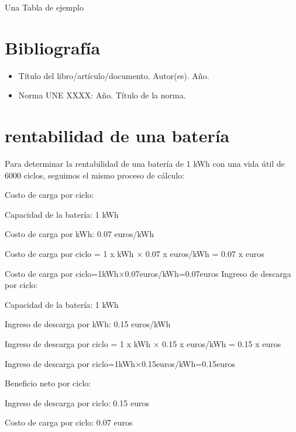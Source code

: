 \documentclass[a4paper,12pt]{article}
\begin{document}
\begin{Form}
\begin{table}[ht]
    \centering
    \caption{Una Tabla de ejemplo}
    \pgfplotstabletypeset[
        col sep=comma,
        every head row/.style={before row=\toprule, after row=\midrule},
        every last row/.style={after row=\bottomrule},
        string type %
    ]{\datosNoNumericos}
\end{table}

\newpage
\section*{Bibliografía}
\begin{itemize}
    \item Título del libro/artículo/documento. Autor(es). Año.
    \item Norma UNE XXXX: Año. Título de la norma.
\end{itemize}



\section*{rentabilidad de una batería}



Para determinar la rentabilidad de una batería de 1 kWh con una vida útil de 6000 ciclos, seguimos el mismo proceso de cálculo:

Costo de carga por ciclo:

Capacidad de la batería: 1 kWh

Costo de carga por kWh: 0.07 euros/kWh

Costo de carga por ciclo
=
1
x
kWh
×
0.07
x
euros/kWh
=
0.07
x
euros

Costo de carga por ciclo=1kWh×0.07euros/kWh=0.07euros
Ingreso de descarga por ciclo:


Capacidad de la batería: 1 kWh

Ingreso de descarga por kWh: 0.15 euros/kWh

Ingreso de descarga por ciclo
=
1
x
kWh
×
0.15
x
euros/kWh
=
0.15
x
euros

Ingreso de descarga por ciclo=1kWh×0.15euros/kWh=0.15euros

Beneficio neto por ciclo:

Ingreso de descarga por ciclo: 0.15 euros

Costo de carga por ciclo: 0.07 euros


\end{Form}
\end{document}
